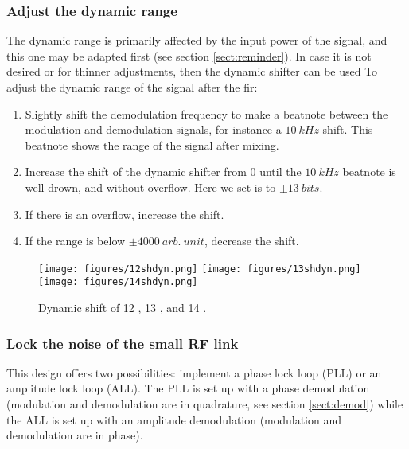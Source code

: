\documentclass[12pt,oneside]{article}
\begin{document}
\subsubsection{Adjust the dynamic range}

The dynamic range is primarily affected by the input power of the signal, and this one may be adapted first (see section \ref{sect:reminder}). In case it is not desired or for thinner adjustments, then the dynamic shifter can be used To adjust the dynamic range of the signal after the fir: 

\vspace{0.3cm}
\begin{enumerate}
	\setlength\itemsep{-0.1cm}
	\item Slightly shift the demodulation frequency to make a beatnote between the modulation and demodulation signals, for instance a $10~kHz$ shift. This beatnote shows the range of the signal after mixing. 
	\item Increase the shift of the dynamic shifter from $0$ until the $10~kHz$ beatnote is well drown, and without overflow. Here we set is to $\pm 13~bits$.
	\item If there is an overflow, increase the shift.
	\item If the range is below $\pm 4000~arb.~unit$, decrease the shift.
\end{enumerate}
\vspace{0.3cm}

\begin{figure}[h!tb]
	\begin{center}
		\vspace{0.5cm}
		\texttt{[image: figures/12shdyn.png]}
		\texttt{[image: figures/13shdyn.png]}
		\texttt{[image: figures/14shdyn.png]}
		\caption{Dynamic shift of 12 {\color{red}}, 13 {\color{OliveGreen}}, and 14 {\color{red}}.}
		\label{fig:shdynadj}
	\end{center}
\end{figure}
\vspace{2cm}


\subsubsection{Lock the noise of the small RF link}

This design offers two possibilities: implement a phase lock loop (PLL) or an amplitude lock loop (ALL). The PLL is set up with a phase demodulation (modulation and demodulation are in quadrature, see section \ref{sect:demod}) while the ALL is set up with an amplitude demodulation (modulation and demodulation are in phase). 
\end{document}

